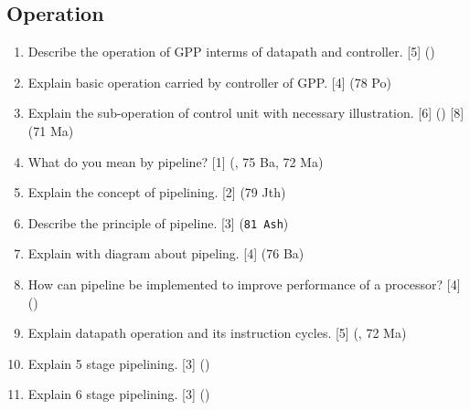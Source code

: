 \documentclass[12pt]{article}
\begin{document}
  \subsection{Operation}
    \begin{enumerate}[topsep=0pt]
      \item Describe the operation of GPP interms of datapath and controller. \hfill [5] ()

      \item Explain basic operation carried by controller of GPP. \hfill [4] (78 Po)

      \item Explain the sub-operation of control unit with necessary illustration. \hfill [6] () [8] (71 Ma) 
      
      \item What do you mean by pipeline? \hfill [1] (, 75 Ba, 72 Ma)

      \item Explain the concept of pipelining. \hfill [2] (79 Jth)

      \item Describe the principle of pipeline. \hfill [3] (\texttt{81 Ash})

      \item Explain with diagram about pipeling. \hfill [4] (76 Ba)
      
      \item How can pipeline be implemented to improve performance of a processor? \hfill [4] ()
      
      \item Explain datapath operation and its instruction cycles. \hfill [5] (, 72 Ma) 

      \item Explain 5 stage pipelining. \hfill [3] () 
      
      \item Explain 6 stage pipelining. \hfill [3] ()   
    \end{enumerate}
\end{document}

